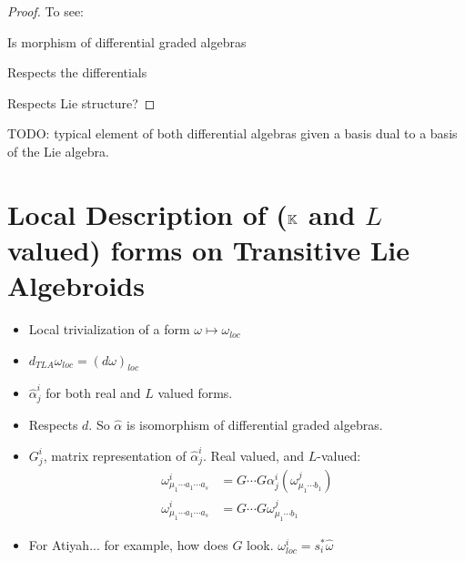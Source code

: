 \begin{proof}
To see:

Is morphism of differential graded algebras

Respects the differentials

Respects Lie structure?
\end{proof}

TODO: typical element of both differential algebras given a basis dual to a basis of the Lie algebra.
\section{Local Description of ($\mathbb{K}$ and $L$ valued) forms on Transitive Lie Algebroids}

\begin{itemize}
    
\item Local trivialization of a form $\omega \mapsto \omega_{loc}$

\item $d_{TLA}\omega_{loc} = (d \omega)_{loc}$

\item $\hat \alpha^i_j$ for both real and $L$ valued forms.

\item Respects $d$. So $\hat \alpha$ is isomorphism of differential graded algebras.

\item $G^i_j$, matrix representation of $\hat \alpha^i_j$. Real valued, and $L$-valued:
    \begin{align}
        \omega^i_{\mu_1 \cdots a_1 \cdots a_s} &= G\cdots G \alpha^i_j(\omega^j_{\mu_1 \cdots b_1}) \\
        \omega^i_{\mu_1 \cdots a_1 \cdots a_s} &= G\cdots G \omega^j_{\mu_1 \cdots b_1}
    \end{align}

\item For Atiyah... for example, how does $G$ look. $\omega^i_{loc} = s_i^* \hat \omega$
    
\end{itemize}



